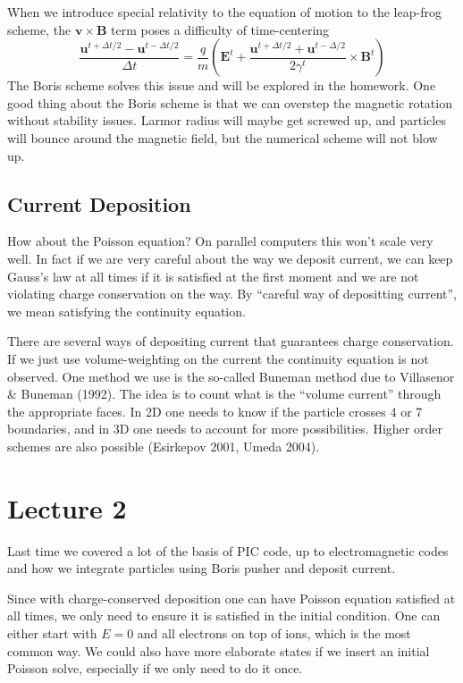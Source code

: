 \documentclass[letterpaper, 11pt]{article}
\numberwithin{equation}{section}
\numberwithin{figure}{section}
\begin{document}
When we introduce special relativity to the equation of motion to the leap-frog
scheme, the $\mathbf{v}\times \mathbf{B}$ term poses a difficulty of
time-centering
\begin{equation}
  \label{eq:4}
  \frac{\mathbf{u}^{t + \Delta t/2} - \mathbf{u}^{t - \Delta t/2}}{\Delta t} = \frac{q}{m}\left( \mathbf{E}^t + \frac{\mathbf{u}^{t+\Delta t/2} + \mathbf{u}^{t - \Delta/2}}{2\gamma^t}\times \mathbf{B}^t \right)
\end{equation}
The Boris scheme solves this issue and will be explored in the homework. One
good thing about the Boris scheme is that we can overstep the magnetic rotation
without stability issues. Larmor radius will maybe get screwed up, and particles
will bounce around the magnetic field, but the numerical scheme will not blow
up.

\subsection{Current Deposition}

How about the Poisson equation? On parallel computers this won't scale very
well. In fact if we are very careful about the way we deposit current, we can
keep Gauss's law at all times if it is satisfied at the first moment and we are
not violating charge conservation on the way. By ``careful way of depositting
current'', we mean satisfying the continuity equation.

There are several ways of depositing current that guarantees charge
conservation. If we just use volume-weighting on the current the continuity
equation is not observed. One method we use is the so-called Buneman method due
to Villasenor \& Buneman (1992). The idea is to count what is the ``volume
current'' through the appropriate faces. In 2D one needs to know if the particle
crosses 4 or 7 boundaries, and in 3D one needs to account for more
possibilities. Higher order schemes are also possible (Esirkepov 2001, Umeda
2004).

\section{Lecture 2}

Last time we covered a lot of the basis of PIC code, up to electromagnetic
codes and how we integrate particles using Boris pusher and deposit current. 

Since with charge-conserved deposition one can have Poisson equation satisfied
at all times, we only need to ensure it is satisfied in the initial condition.
One can either start with $E = 0$ and all electrons on top of ions, which is the
most common way. We could also have more elaborate states if we insert an
initial Poisson solve, especially if we only need to do it once.
\end{document}
